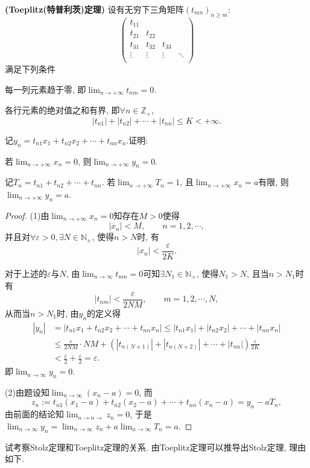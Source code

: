 \begin{quizb}
\woe \textbf{(Toeplitz(特普利茨)定理)} 设有无穷下三角矩阵\((t_{mn})_{n\geqslant m}\):
    \[\left(\begin{matrix}
      t_{11}& & & \\
      t_{21}&t_{22}&&\\
      t_{31}&t_{32}&t_{33}&\\
      \vdots&\vdots&\vdots&\ddots\\
    \end{matrix}\right)\]满足下列条件
\begin{compactenum}[(i)]
\item 每一列元素趋于零, 即\(\lim_{n\rightarrow+\infty}t_{nm}=0\).
\item 各行元素的绝对值之和有界, 即\(\forall n\in \mathbb{Z}_+\), \[\left|t_{n1}\right|+\left|t_{n2}\right|+\cdots+\left|t_{nn}\right|\leqslant K<+\infty.\]  
\end{compactenum}
记\(y_n=t_{n1}x_1+t_{n2}x_2+\cdots+t_{nn}x_n\).证明:\begin{quizs}
\item 若\(\lim_{n\rightarrow+\infty}x_{n}=0\), 则\(\lim_{n\rightarrow+\infty}y_{n}=0\).
\item 记\(T_{n}=t_{n1}+t_{n2}+\cdots+t_{nn}\). 若\(\lim_{n\rightarrow+\infty}T_{n}=1\), 且\(\lim_{n\rightarrow+\infty}x_{n}=a\)有限, 则\(\lim_{n\rightarrow+\infty}y_{n}=a\).
\begin{proof}
(1)由\(\lim_{n\rightarrow+\infty}x_{n}=0\)知存在\(M>0\)使得\[|x_n|<M,\qquad n=1,2,\cdots,\]并且对\(\forall\varepsilon>0,\exists N\in\mathbb{N}_+\), 使得\(n>N\)时, 有\[|x_n|<\frac{\varepsilon}{2K}.\]

对于上述的\(\varepsilon\)与\(N\), 由\(\lim_{n\rightarrow\infty}t_{nm}=0\)可知\(\exists N_1\in\mathbb{N}_+\), 使得\(N_1>N\), 且当\(n>N_1\)时有\[|t_{nm}|<\frac{\varepsilon}{2NM},\qquad m=1,2,\cdots,N,\]从而当\(n>N_1\)时, 由\(y_n\)的定义得\[\begin{split}
|y_n|&=|t_{n1}x_1+t_{n2}x_2+\cdots+t_{nn}x_n|\leqslant|t_{n1}x_1|+|t_{n2}x_2|+\cdots+|t_{nn}x_n|\\&\leqslant\frac{\varepsilon}{2NM}\cdot NM+\left(|t_{n(N+1)}|+|t_{n(N+2)}|+\cdots+|t_{nn}|\right)\frac{\varepsilon}{2K}\\&<\frac{\varepsilon}{2}+\frac{\varepsilon}{2}=\varepsilon.
\end{split}\]即\(\lim_{n\rightarrow\infty}y_n=0.\)

(2)由题设知\(\lim_{n\rightarrow\infty}\left(x_n-a\right)=0\), 而\[
z_n:=t_{n1}(x_1-a)+t_{n2}(x_2-a)+\cdots+t_{nn}(x_n-a)=y_n-aT_n,\]由前面的结论知\(\lim_{n\rightarrow n\rightarrow}z_n=0\), 于是\(\lim_{n\rightarrow\infty}y_n=\lim_{n\rightarrow\infty}z_n+a\lim_{n\rightarrow\infty}T_n=a.\)
\end{proof}
\end{quizs}
\woe 试考察Stolz定理和Toeplitz定理的关系.
\tcbline
由Toeplitz定理可以推导出Stolz定理, 理由如下.


\end{quizb}
